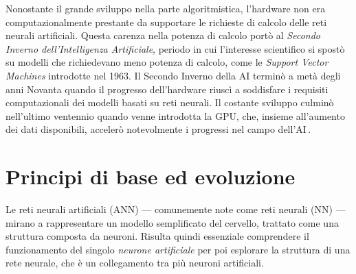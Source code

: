Nonostante il grande sviluppo nella parte algoritmistica, l'hardware non era computazionalmente prestante da supportare le richieste di calcolo delle reti neurali artificiali. Questa carenza nella potenza di calcolo portò al \textsl{Secondo Inverno dell'Intelligenza Artificiale}, periodo in cui l'interesse scientifico si spostò su modelli che richiedevano meno potenza di calcolo, come le \textit{Support Vector Machines} introdotte nel 1963. Il Secondo Inverno della \acs{AI} terminò a metà degli anni Novanta quando il progresso dell'hardware riuscì a soddisfare i requisiti computazionali dei modelli basati su reti neurali. Il costante sviluppo culminò nell'ultimo ventennio quando venne introdotta la GPU, che, insieme all'aumento dei dati disponibili, accelerò notevolmente i progressi nel campo dell'\acs{AI}\,\cite{flasinski2016introduction, muthukrishnan2020brief}.

\section{Principi di base ed evoluzione}
%
Le reti neurali artificiali (\acs{ANN}) — comunemente note come reti neurali (\acs{NN}) — mirano a rappresentare un modello semplificato del cervello, trattato come una struttura composta da neuroni. Risulta quindi essenziale comprendere il funzionamento del singolo \textsl{neurone artificiale} per poi esplorare la struttura di una rete neurale, che è un collegamento tra più neuroni artificiali.

